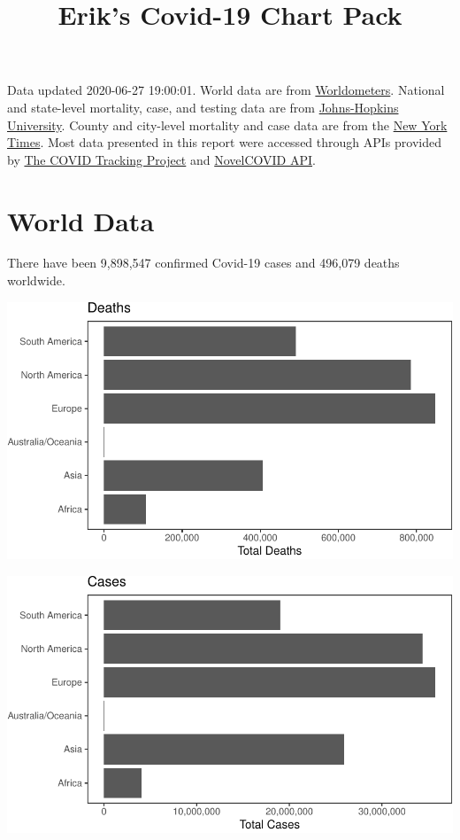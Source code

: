\documentclass[]{article}
\title{Erik's Covid-19 Chart Pack}
\author{}
\date{}
\begin{document}
\maketitle

Data updated 2020-06-27 19:00:01. World data are from
\href{https://github.com/NovelCovid/API}{Worldometers}. National and
state-level mortality, case, and testing data are from
\href{https://covidtracking.com}{Johns-Hopkins University}. County and
city-level mortality and case data are from the
\href{https://github.com/NovelCovid/API}{New York Times}. Most data
presented in this report were accessed through APIs provided by
\href{https://covidtracking.com}{The COVID Tracking Project} and
\href{https://github.com/NovelCovid/API}{NovelCOVID API}.

\hypertarget{world-data}{%
\section{World Data}\label{world-data}}

There have been 9,898,547 confirmed Covid-19 cases and 496,079 deaths
worldwide.

\includegraphics{covid_files/figure-latex/unnamed-chunk-1-1.pdf}

\includegraphics{covid_files/figure-latex/unnamed-chunk-2-1.pdf}
\end{document}
